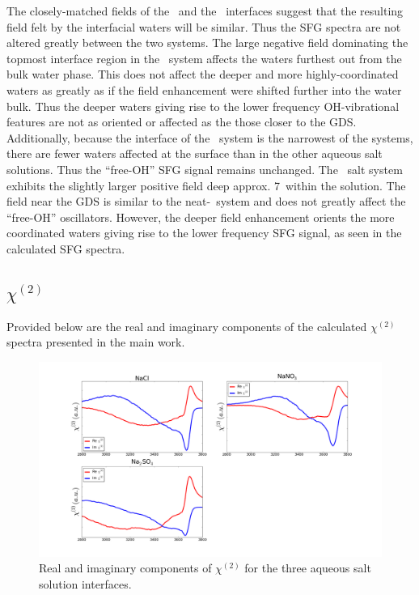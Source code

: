 \documentclass[12pt]{article}
\begin{document}
The closely-matched fields of the \ctcwat~and the \nacl~interfaces suggest that the resulting field felt by the interfacial waters will be similar. Thus the SFG spectra are not altered greatly between the two systems. The large negative field dominating the topmost interface region in the \sodnit~system affects the waters furthest out from the bulk water phase. This does not affect the deeper and more highly-coordinated waters as greatly as if the field enhancement were shifted further into the water bulk. Thus the deeper waters giving rise to the lower frequency OH-vibrational features are not as oriented or affected as the those closer to the GDS. Additionally, because the interface of the \sodnit~system is the narrowest of the systems, there are fewer waters affected at the surface than in the other aqueous salt solutions. Thus the ``free-OH'' SFG signal remains unchanged. The \sodsul~salt system exhibits the slightly larger positive field deep approx. 7\angs~within the solution. The field near the GDS is similar to the neat-\ctcwat~system and does not greatly affect the ``free-OH'' oscillators. However, the deeper field enhancement orients the more coordinated waters giving rise to the lower frequency SFG signal, as seen in the calculated SFG spectra.

\subsection{$\chi^{(2)}$}

Provided below are the real and imaginary components of the calculated $\chi^{(2)}$ spectra presented in the main work.

\begin{figure}[h!]
\begin{center}
	\includegraphics[scale=1.0]{images/chi2.png}
	\caption{Real and imaginary components of $\chi^{(2)}$ for the three aqueous salt solution interfaces.}
	\label{fig:chi2}
\end{center}
\end{figure}
\end{document}
